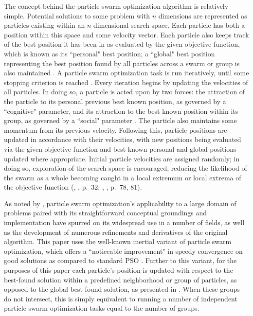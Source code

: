 \documentclass[12pt]{article}
\newcommand{\citetwo}[4]{(\citeauthor{#1}, \citeyear{#1}, p.~#2; \citeauthor{#3}, \citeyear{#3}, p.~#4)}
\begin{document}
The concept behind the particle swarm optimization algorithm is relatively simple. Potential solutions to some problem with $n$ dimensions are represented as particles existing within an $n$-dimensional search space. Each particle has both a position within this space and some velocity vector. Each particle also keeps track of the best position it has been in as evaluated by the given objective function, which is known as its ``personal" best position; a ``global" best position representing the best position found by all particles across a swarm or group is also maintained \citep{chong2013}. A particle swarm optimization task is run iteratively, until some stopping criterion is reached \citep[p.~80]{solnon2010}. Every iteration begins by updating the velocities of all particles. In doing so, a particle is acted upon by two forces: the attraction of the particle to its personal previous best known position, as governed by a ``cognitive" parameter, and its attraction to the best known position within its group, as governed by a ``social" parameter \citep{chong2013}. The particle also maintains some momentum from its previous velocity. Following this, particle positions are updated in accordance with their velocities, with new positions being evaluated via the given objective function and best-known personal and global positions updated where appropriate. Initial particle velocities are assigned randomly; in doing so, exploration of the search space is encouraged, reducing the likelihood of the swarm as a whole becoming caught in a local extremum or local extrema of the objective function \citetwo{yang2014}{32}{solnon2010}{78, 81}. 

As noted by \citet*[p.~99]{yang2014}, particle swarm optimization's applicability to a large domain of problems paired with its straightforward conceptual groundings and implementation have spurred on its widespread use in a number of fields, as well as the development of numerous refinements and derivatives of the original algorithm. This paper uses the well-known inertial variant of particle swarm optimization, which offers a ``noticeable improvement" in speedy convergence on good solutions as compared to standard PSO \citep[p.~101]{yang2014}. Further to this variant, for the purposes of this paper each particle's position is updated with respect to the best-found solution within a predefined neighborhood or group of particles, as opposed to the global best-found solution, as presented in \citet*[p.~79]{solnon2010}. When these groups do not intersect, this is simply equivalent to running a number of independent particle swarm optimization tasks equal to the number of groups.
\end{document}
